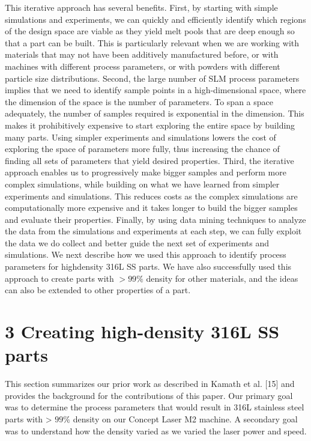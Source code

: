 \documentclass[10pt]{article}
\begin{document}
This iterative approach has several benefits. First, by starting with simple simulations and experiments, we can quickly and efficiently identify which regions of the design space are viable as they yield melt pools that are deep enough so that a part can be built. This is particularly relevant when we are working with materials that may not have been additively manufactured before, or with machines with different process parameters, or with powders with different particle size distributions. Second, the large number of SLM process parameters implies that we need to identify sample points in a high-dimensional space, where the dimension of the space is the number of parameters. To span a space adequately, the number of samples required is exponential in the dimension. This makes it prohibitively expensive to start exploring the entire space by building many parts. Using simpler experiments and simulations lowers the cost of exploring the space of parameters more fully, thus increasing the chance of finding all sets of parameters that yield desired properties. Third, the iterative approach enables us to progressively make bigger samples and perform more complex simulations, while building on what we have learned from simpler experiments and simulations. This reduces costs as the complex simulations are computationally more expensive and it takes longer to build the bigger samples and evaluate their properties. Finally, by using data mining techniques to analyze the data from the simulations and experiments at each step, we can fully exploit the data we do collect and better guide the next set of experiments and simulations. We next describe how we used this approach to identify process parameters for highdensity 316L SS parts. We have also successfully used this approach to create parts with $>99 \%$ density for other materials, and the ideas can also be extended to other properties of a part.

\section*{3 Creating high-density 316L SS parts}
This section summarizes our prior work as described in Kamath et al. [15] and provides the background for the contributions of this paper. Our primary goal was to determine the process parameters that would result in 316L stainless steel parts with > $99 \%$ density on our Concept Laser M2 machine. A secondary goal was to understand how the density varied as we varied the laser power and speed.
\end{document}
